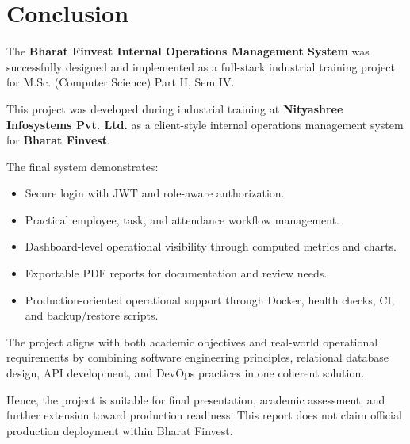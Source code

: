 \chapter{Conclusion}

The \textbf{Bharat Finvest Internal Operations Management System} was successfully designed and implemented as a full-stack industrial training project for M.Sc. (Computer Science) Part II, Sem IV.

This project was developed during industrial training at \textbf{Nityashree Infosystems Pvt. Ltd.} as a client-style internal operations management system for \textbf{Bharat Finvest}.

The final system demonstrates:
\begin{itemize}[leftmargin=1.3cm]
\item Secure login with JWT and role-aware authorization.
\item Practical employee, task, and attendance workflow management.
\item Dashboard-level operational visibility through computed metrics and charts.
\item Exportable PDF reports for documentation and review needs.
\item Production-oriented operational support through Docker, health checks, CI, and backup/restore scripts.
\end{itemize}

The project aligns with both academic objectives and real-world operational requirements by combining software engineering principles, relational database design, API development, and DevOps practices in one coherent solution.

Hence, the project is suitable for final presentation, academic assessment, and further extension toward production readiness. This report does not claim official production deployment within Bharat Finvest.
